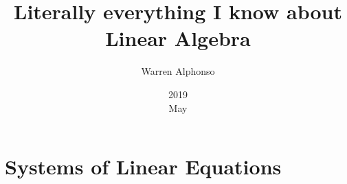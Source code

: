 \documentclass[a4paper,11pt]{book}
\title{Literally everything I know about Linear Algebra}
\date{2019 \\ May}
\author{Warren Alphonso}
\theoremstyle{definition}
\begin{document}
\frontmatter 
{\let\cleardoublepage\clearpage 
\maketitle
\tableofcontents
}

\mainmatter
\chapter{Systems of Linear Equations}

\end{document}
